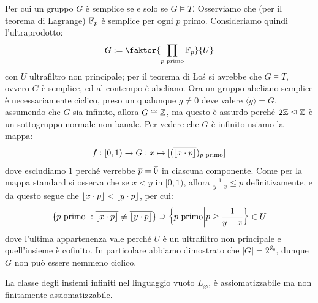 \begin{soln}
\begin{enumerate}
        Per cui un gruppo $G$ è semplice se e solo se $G \models T$. Osserviamo che (per il teorema di Lagrange) $\mathbb F_p$ è semplice per ogni $p$ primo. Consideriamo quindi l'ultraprodotto:
        \[ G := \faktor{\prod_{p \text{ primo}} \FF_p}{U}
        \]
        con $U$ ultrafiltro non principale; per il teorema di Łoś si avrebbe che $G \models T$, ovvero $G$ è semplice, ed al contempo è abeliano.
        Ora un gruppo abeliano semplice è necessariamente ciclico, preso un qualunque $g \ne 0$ deve valere $\langle g \rangle = G$, assumendo che $G$ sia infinito, allora $G \cong \mathbb Z$,
        ma questo è assurdo perché $2\mathbb Z \trianglelefteq \mathbb Z$ è un sottogruppo normale non banale. Per vedere che $G$ è infinito usiamo la mappa:
        \[ f : [0,1) \to G : x \mapsto [(\overline{\left\lfloor x \cdot p \right\rfloor})_{p \text{ primo}}] \]
        dove escludiamo $1$ perché verrebbe $\overline p = \overline 0$ in ciascuna componente. Come per la mappa standard si osserva che se $x < y$ in $[0,1)$, allora $\frac{1}{y-x} \leq p$ definitivamente, e da questo
        segue che $\left\lfloor x \cdot p \right\rfloor < \left\lfloor y \cdot p \right\rfloor$, per cui:
        \[ \{p \text{ primo } : \overline{\left\lfloor x \cdot p \right\rfloor} \neq \overline{\left\lfloor y \cdot p \right\rfloor}\} \supseteq \left\{p \text{ primo} \middle| p \geq \frac{1}{y-x}\right\} \in U
        \]
        dove l'ultima appartenenza vale perché $U$ è un ultrafiltro non principale e quell'insieme è cofinito. In particolare abbiamo dimostrato che $|G| = 2^{\aleph_0}$,
        dunque $G$ non può essere nemmeno ciclico.
    \end{enumerate}
\end{soln}

\begin{example}
    La classe degli insiemi infiniti nel linguaggio vuoto $L_\varnothing$, è assiomatizzabile ma non finitamente assiomatizzabile.
\end{example}


